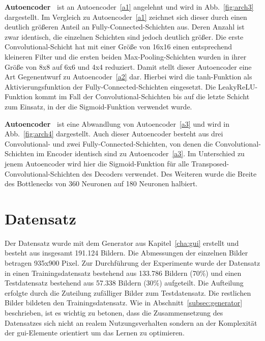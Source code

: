 \label{Autoencoder2VAEMediumConvSmallKernelBigBottleneck}
\textbf{Autoencoder~} ist an Autoencoder~\ref{a1} angelehnt und wird in Abb.~\ref{fig:arch3} dargestellt. Im Vergleich zu Autoencoder~\ref{a1} zeichnet sich dieser durch einen deutlich größeren Anteil an Fully-Connected-Schichten aus. Deren Anzahl ist zwar identisch, die einzelnen Schichten sind jedoch deutlich größer. Die erste Convolutional-Schicht hat mit einer Größe von 16x16 einen entsprechend kleineren Filter und die ersten beiden Max-Pooling-Schichten wurden in ihrer Größe von 8x8 auf 6x6 und 4x4 reduziert. Damit stellt dieser Autoencoder eine Art Gegenentwurf zu Autoencoder~\ref{a2} dar. Hierbei wird die tanh-Funktion als Aktivierungsfunktion der Fully-Connected-Schichten eingesetzt. Die LeakyReLU-Funktion kommt im Fall der Convolutional-Schichten bis auf die letzte Schicht zum Einsatz, in der die Sigmoid-Funktion verwendet wurde.

\label{AutoencoderVAEMediumConvSmallKernel}
\textbf{Autoencoder~} ist eine Abwandlung von Autoencoder~\ref{a3} und wird in Abb.~\ref{fig:arch4} dargestellt. Auch dieser Autoencoder besteht aus drei Convolutional- und zwei Fully-Connected-Schichten, von denen die Convolutional-Schichten im Encoder identisch sind zu Autoencoder~\ref{a3}. Im Unterschied zu jenem Autoencoder wird hier die Sigmoid-Funktion für alle Transposed-Convolutional-Schichten des Decoders verwendet. Des Weiteren wurde die Breite des Bottlenecks von 360 Neuronen auf 180 Neuronen halbiert.

\section{Datensatz}
Der Datensatz wurde mit dem Generator aus Kapitel~\ref{cha:gui} erstellt und besteht aus insgesamt 191.124 Bildern. Die Abmessungen der einzelnen Bilder betragen 935x900 Pixel.
Zur Durchführung der Experimente wurde der Datensatz in einen Trainingsdatensatz bestehend aus 133.786 Bildern (70\%) und einen Testdatensatz bestehend aus 57.338 Bildern (30\%) aufgeteilt. Die Aufteilung erfolgte durch die Zuteilung zufälliger Bilder zum Testdatensatz. Die restlichen Bilder bildeten den Trainingsdatensatz. Wie in Abschnitt~\ref{subsec:generator} beschrieben, ist es wichtig zu betonen, dass die Zusammensetzung des Datensatzes sich nicht an realem Nutzungsverhalten sondern an der Komplexität der \gls{gui}-Elemente orientiert um das Lernen zu optimieren.

